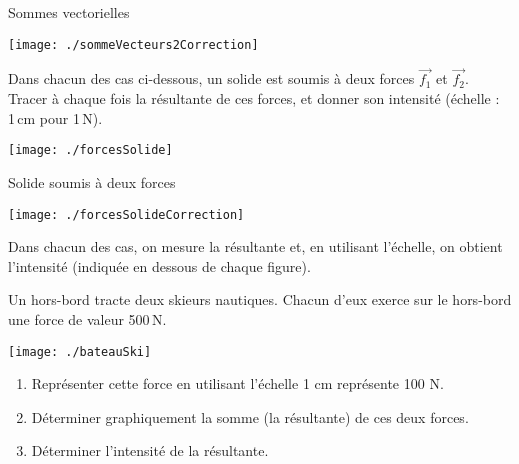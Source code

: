 \begin{corrige}
Sommes vectorielles

\begin{center}
    \texttt{[image: ./sommeVecteurs2Correction]}   
\end{center}

\end{corrige}





\begin{exercice}
Dans chacun des cas ci-dessous, un solide est soumis à deux forces $\vec{f_1}$ et $\vec{f_2}$. Tracer à chaque fois la résultante de ces forces, et donner son intensité (échelle : 1\,cm pour 1\,N).

\vspace{1em}
\begin{center}
    \texttt{[image: ./forcesSolide]}   
\end{center}

\end{exercice}


\begin{corrige}
Solide soumis à deux forces

\begin{center}
    \texttt{[image: ./forcesSolideCorrection]}   
\end{center}

Dans chacun des cas, on mesure la résultante et, en utilisant l'échelle, on obtient l'intensité (indiquée en dessous de chaque figure).
\end{corrige}




\begin{exercice}
Un hors-bord tracte deux skieurs nautiques. Chacun d'eux exerce sur le hors-bord une force de valeur 500\,N.

\vspace{1em}
\begin{center}
    \texttt{[image: ./bateauSki]}   
\end{center}


\begin{enumerate}
\item Représenter cette force en utilisant l’échelle 1 cm représente 100 N.
\item Déterminer graphiquement la somme (la résultante) de ces deux forces.
\item Déterminer l'intensité de la résultante.
\end{enumerate}
\end{exercice}


